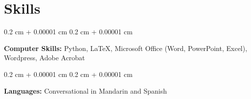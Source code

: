 \documentclass[10pt, letterpaper]{article}
\newenvironment{onecolentry}{
    \begin{adjustwidth}{
        0.2 cm + 0.00001 cm
    }{
        0.2 cm + 0.00001 cm
    }
}{
    \end{adjustwidth}
} %
\newenvironment{twocolentry}[2][]{
    \onecolentry
    \def\secondColumn{#2}
    \setcolumnwidth{\fill, 4.5 cm}
    \begin{paracol}{2}
}{
    \switchcolumn \raggedleft \secondColumn
    \end{paracol}
    \endonecolentry
} %
\let\hrefWithoutArrow\href
\renewcommand{\href}[2]{\hrefWithoutArrow{#1}{\ifthenelse{\equal{#2}{}}{ }{#2 }\raisebox{.15ex}{\footnotesize \faExternalLink*}}}
\begin{document}
    
    
    \section{Skills}



        
        \begin{onecolentry}
            \textbf{Computer Skills:} Python, LaTeX, Microsoft Office (Word, PowerPoint, Excel), Wordpress, Adobe Acrobat
        \end{onecolentry}
        \begin{onecolentry}
            \textbf{Languages:} Conversational in Mandarin and Spanish
        \end{onecolentry}

        

    

 
        
  
   



    



        







    
\end{document}
